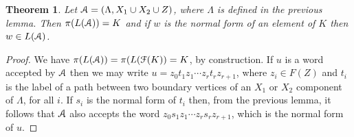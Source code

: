 \documentclass[a4paper,12pt]{article}
\renewcommand{\L}{\Lambda }
\newcommand{\cA}{{\cal{A}}}
\newcommand{\cF}{{\cal{F}}}
\newtheorem{theorem}{Theorem}[section]
\numberwithin{equation}{section}
\numberwithin{figure}{section}
\begin{document}
\begin{theorem}
Let $\cA=(\L,X_1\cup X_2\cup Z)$, where $\L$ is defined in the previous
lemma. Then $\pi(L(\cA))=K$ and if $w$ is the normal form of an element
of $K$ then $w\in L(\cA)$. 
\end{theorem}
\begin{proof}
We have $\pi(L(\cA))=\pi(L(\cF(K))=K$, by construction. If $u$ is a word
accepted by $\cA$ then we may write $u=z_0t_1z_1\cdots z_rt_rz_{r+1}$, where
$z_i\in F(Z)$ and $t_i$ is the label of a path between two boundary
vertices of an $X_1$ or $X_2$ component of $\L$, for all $i$. If 
$s_i$ is the normal form of $t_i$ then, from the previous lemma, it follows
that $\cA$ also accepts the word $z_0s_1z_1\cdots z_rs_rz_{r+1}$, which
is the normal form of $u$. 
\end{proof}


\end{document}
